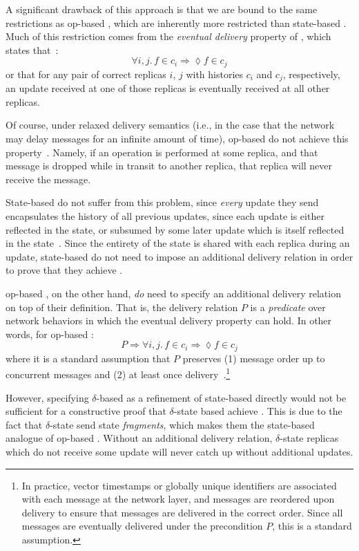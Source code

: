 A significant drawback of this approach is that we are bound to the same
restrictions as op-based \CRDTs, which are inherently more restricted than
state-based \CRDTs. Much of this restriction comes from the \emph{eventual
delivery} property of \EC, which states that~\citep{shapiro11}:
\[
  \forall i, j.\, f \in c_i \Rightarrow \lozenge f \in c_j
\]
or that for any pair of correct replicas $i$, $j$ with histories $c_i$ and
$c_j$, respectively, an update received at one of those replicas is eventually
received at all other replicas.

Of course, under relaxed delivery semantics (i.e., in the case that the network
may delay messages for an infinite amount of time), op-based \CRDTs do not
achieve this property~\citep{shapiro11}. Namely, if an operation is performed at
some replica, and that message is dropped while in transit to another replica,
that replica will never receive the message.

State-based \CRDTs do not suffer from this problem, since \emph{every} update
they send encapsulates the history of all previous updates, since each update is
either reflected in the state, or subsumed by some later update which is itself
reflected in the state~\citep{shapiro11}. Since the entirety of the state is
shared with each replica during an update, state-based \CRDTs do not need to
impose an additional delivery relation in order to prove that they achieve \SEC.

op-based \CRDTs, on the other hand, \emph{do} need to specify an additional
delivery relation on top of their definition. That is, the delivery relation $P$
is a \emph{predicate} over network behaviors in which the eventual delivery
property can hold. In other words, for op-based \CRDTs:
\[
  P \Rightarrow \forall i, j.\, f \in c_i \Rightarrow \lozenge f \in c_j
\]
where it is a standard assumption that $P$ preserves (1) message order up to
concurrent messages and (2) at least once delivery~\citep{shapiro11,
almedia18}.\footnote{In practice, vector timestamps or globally unique
identifiers are associated with each message at the network layer, and messages
are reordered upon delivery to ensure that messages are delivered in the correct
order. Since all messages are eventually delivered under the precondition $P$,
this is a standard assumption.}

However, specifying $\delta$-based \CRDTs as a refinement of state-based \CRDTs
directly would not be sufficient for a constructive proof that $\delta$-state
based \CRDTs achieve \SEC. This is due to the fact that $\delta$-state \CRDTs
send state \emph{fragments}, which makes them the state-based analogue of
op-based \CRDTs. Without an additional delivery relation, $\delta$-state \CRDT
replicas which do not receive some update will never catch up without additional
updates.

